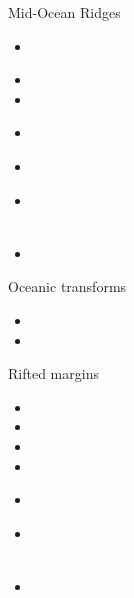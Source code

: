 
Mid-Ocean Ridges
\begin{small}
\begin{itemize}
\item[\twothousandsixteen] 
\\
\item[\twothousandseventeen] 
\item[\twothousandeighteen] 
\item[\twothousandtwentyone] 
\\ 
\item[\twothousandtwentytwo] 
 \\
\item[\twothousandtwentythree] 
\\
\\
\item[\twothousandtwentyfour] 
\end{itemize}
\end{small}

Oceanic transforms
\begin{small}
\begin{itemize}
\item[\twothousandtwentyone] 
\item[\twothousandtwentyfour] 
\end{itemize}
\end{small}


Rifted margins
\begin{small}
\begin{itemize}
\item[\twothousandseventeen] 
\item[\twothousandnineteen] 
\item[\twothousandtwenty] 
\item[\twothousandtwentyone] 
\item[\twothousandtwentytwo] 
 \\
\item[\twothousandtwentythree] 
 \\
 \\ 
\item[\twothousandtwentyfour] 
\end{itemize}
\end{small}


